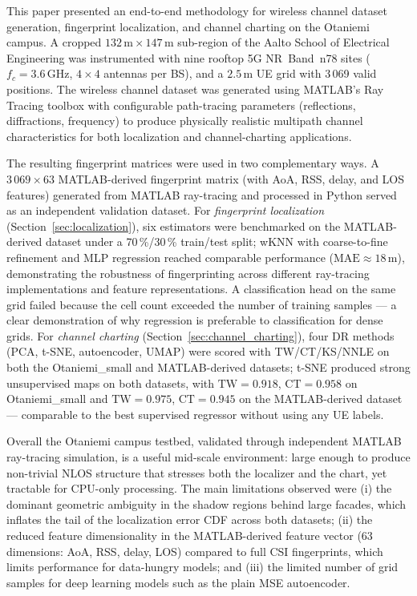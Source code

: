 \label{sec:conclusion}

This paper presented an end-to-end methodology for wireless channel dataset
generation, fingerprint localization, and channel charting on the Otaniemi
campus.
A cropped $132\,\text{m}\times 147\,\text{m}$ sub-region of the Aalto
School of Electrical Engineering was instrumented with nine rooftop
5G NR~Band~n78 sites ($f_c = 3.6\,\text{GHz}$,
$4\times4$ antennas per BS), and a $2.5\,\text{m}$ UE grid with
3\,069 valid positions.
The wireless channel dataset was generated using MATLAB's Ray Tracing
toolbox with configurable path-tracing parameters (reflections, diffractions, frequency)
to produce physically realistic multipath channel characteristics for both
localization and channel-charting applications.

The resulting fingerprint matrices were used in two complementary ways.
A $3\,069 \times 63$ MATLAB-derived fingerprint matrix (with AoA, RSS, delay, and LOS features)
generated from MATLAB ray-tracing and processed in Python served as an independent
validation dataset.
For \emph{fingerprint localization} (Section~\ref{sec:localization}),
six estimators were benchmarked on the MATLAB-derived dataset under a 70\,\%/30\,\% train/test split;
wKNN with coarse-to-fine refinement and MLP regression reached comparable performance
($\text{MAE} \approx 18\,\text{m}$), demonstrating the robustness of fingerprinting
across different ray-tracing implementations and feature representations.
A classification head on the same grid failed because the cell count
exceeded the number of training samples --- a clear demonstration of
why regression is preferable to classification for dense grids.
For \emph{channel charting} (Section~\ref{sec:channel_charting}), four
DR methods (PCA, t-SNE, autoencoder, UMAP) were scored with
TW/CT/KS/NNLE on both the Otaniemi\_small and MATLAB-derived datasets;
t-SNE produced strong unsupervised maps on both datasets, with
$\text{TW}=0.918$, $\text{CT}=0.958$ on Otaniemi\_small and $\text{TW}=0.975$, $\text{CT}=0.945$
on the MATLAB-derived dataset --- comparable to the best supervised regressor without
using any UE labels.

Overall the Otaniemi campus testbed, validated through independent MATLAB ray-tracing
simulation, is a useful mid-scale environment: large enough to produce
non-trivial NLOS structure that stresses both the localizer and the chart, yet tractable
for CPU-only processing.
The main limitations observed were (i) the dominant geometric ambiguity
in the shadow regions behind large facades, which inflates the tail of
the localization error CDF across both datasets; (ii) the reduced feature
dimensionality in the MATLAB-derived feature vector (63 dimensions: AoA, RSS, delay, LOS)
compared to full CSI fingerprints, which limits performance for data-hungry models;
and (iii) the limited number of grid samples for deep learning models such
as the plain MSE autoencoder.

